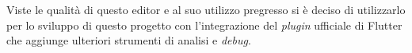 Viste le qualità di questo editor e al suo utilizzo pregresso si è deciso di utilizzarlo per lo sviluppo di questo progetto con l'integrazione del \textit{plugin} ufficiale di Flutter che aggiunge ulteriori strumenti di analisi e \textit{debug}.

